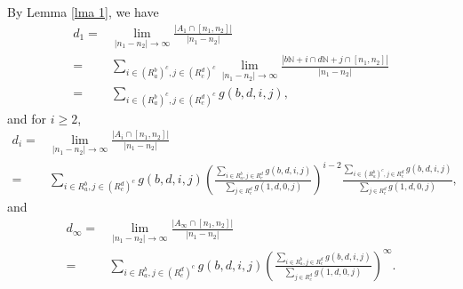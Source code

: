 \documentclass{amsart}
\theoremstyle{definition}
\numberwithin{equation}{section}%
\begin{document}
By Lemma \ref{lma 1}, we have
\begin{equation}\label{eq case2}
\begin{aligned}
    d_1=&\lim_{|n_1-n_2|\to\infty}\frac{|A_1\cap [n_1,n_2]|}{|n_1-n_2|}\\
    =&\sum_{i\in (R_a^b)^c, j\in (R_c^d)^c}\lim_{|n_1-n_2|\to\infty}\frac{|b\mathbb{N}+i\cap d\mathbb{N}+j\cap [n_1,n_2]|}{|n_1-n_2|}\\
    =&\sum_{i\in (R_a^b)^c, j\in (R_c^d)^c}g(b,d,i,j),
     \end{aligned}
     \end{equation}
and for $i\geq 2$,
\begin{equation}\label{eq case2-1}
\begin{aligned}
     d_i=&\lim_{|n_1-n_2|\to\infty}\frac{|A_i\cap [n_1,n_2]|}{|n_1-n_2|}\\
     =&\sum_{i\in R_a^b, j\in (R_c^d)^c}g(b,d,i,j)\left(\frac{\sum_{i\in R_a^b, j\in R_c^d}g(b,d,i,j)}{\sum_{ j\in R_c^d}g(1,d,0,j)}\right)^{i-2} \frac{\sum_{i\in (R_a^b)^c, j\in R_c^d}g(b,d,i,j)}{\sum_{ j\in R_c^d}g(1,d,0,j)},
     \end{aligned}
     \end{equation}
 and
\begin{equation}\label{eq case2-2}
\begin{aligned}
     d_\infty=&\lim_{|n_1-n_2|\to\infty}\frac{|A_\infty\cap [n_1,n_2]|}{|n_1-n_2|}\\
     =&\sum_{i\in R_a^b, j\in (R_c^d)^c}g(b,d,i,j)\left(\frac{\sum_{i\in R_a^b, j\in R_c^d}g(b,d,i,j)}{\sum_{ j\in R_c^d}g(1,d,0,j)}\right)^{\infty}. 
     \end{aligned}
     \end{equation}
\end{document}
